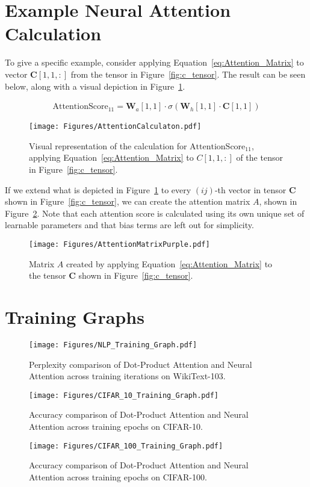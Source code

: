 \documentclass{article}
\begin{document}
\section{Example Neural Attention Calculation}
\label{sec:Example}
To give a specific example, consider applying Equation~\ref{eq:Attention_Matrix} to vector $\mathbf{C}[1,1,:]$ from the tensor in Figure~\ref{fig:c_tensor}. The result can be seen below, along with a visual depiction in Figure~\ref{fig:attention_score_11}.

\begin{align*}
    \text{AttentionScore}_{11} = \mathbf{W}_a[1,1] \cdot \sigma(\mathbf{W}_h[1,1] \cdot \mathbf{C}[1,1])
\end{align*}

\begin{figure}[h!]
    \centering
      \texttt{[image: Figures/AttentionCalculaton.pdf]}
    \caption{Visual representation of the calculation for $\text{AttentionScore}_{11}$, applying Equation~\ref{eq:Attention_Matrix} to $C[1,1,:]$ of the tensor in Figure~\ref{fig:c_tensor}.}
    \label{fig:attention_score_11}
\end{figure}

If we extend what is depicted in Figure~\ref{fig:attention_score_11} to every $(ij)$-th vector in tensor $\mathbf{C}$ shown in Figure~\ref{fig:c_tensor}, we can create the attention matrix $\mathit{A}$, shown in Figure~\ref{fig:attention_matrix}. Note that each attention score is calculated using its own unique set of learnable parameters and that bias terms are left out for simplicity.
\begin{figure}[H]
    \centering
      \texttt{[image: Figures/AttentionMatrixPurple.pdf]}
    \caption{Matrix $\mathit{A}$ created by applying Equation~\ref{eq:Attention_Matrix} to the tensor $\mathbf{C}$ shown in Figure~\ref{fig:c_tensor}.}
    \label{fig:attention_matrix}
\end{figure}

\section{Training Graphs}
\label{sec:graphs}
\begin{figure}[H]
    \centering
      \texttt{[image: Figures/NLP\_Training\_Graph.pdf]}
    \caption{Perplexity comparison of Dot-Product Attention and Neural Attention across training iterations on WikiText-103.}
    \label{fig:NLP_Graph}
\end{figure}

\begin{figure}[H]
    \centering
      \texttt{[image: Figures/CIFAR\_10\_Training\_Graph.pdf]}
    \caption{Accuracy comparison of Dot-Product Attention and Neural Attention across training epochs on CIFAR-10.}
    \label{fig:CIFAR10_Graph}
\end{figure}


\begin{figure}[H]
    \centering
      \texttt{[image: Figures/CIFAR\_100\_Training\_Graph.pdf]}
    \caption{Accuracy comparison of Dot-Product Attention and Neural Attention across training epochs on CIFAR-100.}
    \label{fig:CIFAR100_Graph}
\end{figure}
\end{document}

